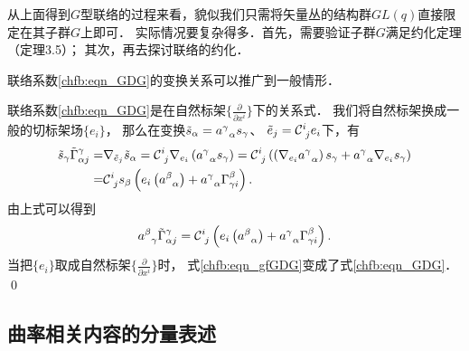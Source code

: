 
\begin{remark}
从上面得到$G$型联络的过程来看，貌似我们只需将矢量丛的结构群$GL(q)$直接限定在其子群$G$上即可．
实际情况要复杂得多．首先，需要验证子群$G$满足{\kaishu 约化定理}（\parencite[\S 10.3]{chen-li-2026-2ed-v2}定理3.5）；
其次，再去探讨联络的约化．
\end{remark}

\begin{example}
	联络系数\eqref{chfb:eqn_GDG}的变换关系可以推广到一般情形．
\end{example}
联络系数\eqref{chfb:eqn_GDG}是在自然标架$\{\frac{\partial }{\partial x^i}\}$下的关系式．
我们将自然标架换成一般的切标架场$\{e_i\}$，
那么在变换$\tilde{s}_\alpha=a_{\hphantom{\alpha}\alpha}^\gamma s_\gamma$、
$\tilde{e}_j=\mathcal{C}_{\hphantom{i}j}^i e_i$下，有
\begin{align*}
	\tilde{s}_\gamma \tilde{\Gamma}^\gamma_{\alpha j}
	=&  \nabla_{\tilde{e}_j} \tilde{s}_\alpha 
	= \mathcal{C}_{\hphantom{i}j}^i \nabla_{e_i} \left(a_{\hphantom{\alpha}\alpha}^\gamma s_\gamma\right)
	= \mathcal{C}_{\hphantom{i}j}^i \left( \left(\nabla_{e_i} a_{\hphantom{\alpha}\alpha}^\gamma\right) s_\gamma
	+ a_{\hphantom{\alpha}\alpha}^\gamma  \nabla_{e_i} s_\gamma\right) \\
	=& \mathcal{C}_{\hphantom{i}j}^i s_\beta \left({e_i}\left( a_{\hphantom{\alpha}\alpha}^\beta\right) 
	+ a_{\hphantom{\alpha}\alpha}^\gamma \Gamma_{\gamma i}^\beta \right) .
\end{align*}
由上式可以得到
\begin{equation}\label{chfb:eqn_gfGDG}
	a_{\hphantom{\alpha}\gamma}^\beta \tilde{\Gamma}^\gamma_{\alpha j} = \mathcal{C}_{\hphantom{i}j}^i 
	\left({e_i}\left( a_{\hphantom{\alpha}\alpha}^\beta\right) 
	+ a_{\hphantom{\alpha}\alpha}^\gamma \Gamma_{\gamma i}^\beta \right) .
\end{equation}
当把$\{e_i\}$取成自然标架$\{\frac{\partial }{\partial x^i}\}$时，
式\eqref{chfb:eqn_gfGDG}变成了式\eqref{chfb:eqn_GDG}．
\qed








\subsection{曲率相关内容的分量表述}

